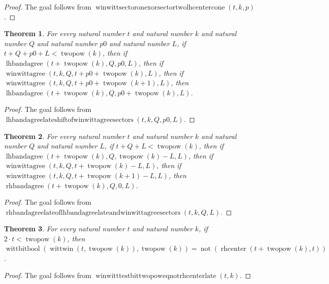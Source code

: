 \documentclass[11pt]{article}
\newtheorem{theorem}{Theorem}[section]
\theoremstyle{definition}
\begin{document}
\begin{proof}
The goal follows from \(\operatorname{winwittsectoronexorsectortwolhcentercone}(t, k, p)\).
\end{proof}
\begin{theorem}
\label{ll:paper:lhbandagree-late-shift-of-winwittagree-sectors}
For every natural number \(t\) and natural number \(k\) and natural number \(Q\) and natural number \(p0\) and natural number \(L\), if \(t + Q + p0 + L < \operatorname{twopow}(k)\), then if \(\operatorname{lhbandagree}(t + \operatorname{twopow}(k), Q, p0, L)\), then if \(\operatorname{winwittagree}(t, k, Q, t + p0 + \operatorname{twopow}(k), L)\), then if \(\operatorname{winwittagree}(t, k, Q, t + p0 + \operatorname{twopow}(k + 1), L)\), then \(\operatorname{lhbandagree}(t + \operatorname{twopow}(k), Q, p0 + \operatorname{twopow}(k), L)\).
\end{theorem}
\begin{proof}
The goal follows from \(\operatorname{lhbandagreelateshiftofwinwittagreesectors}(t, k, Q, p0, L)\).
\end{proof}
\begin{theorem}
\label{ll:paper:rhbandagree-late-of-lhbandagree-late-and-winwittagree-sectors}
For every natural number \(t\) and natural number \(k\) and natural number \(Q\) and natural number \(L\), if \(t + Q + L < \operatorname{twopow}(k)\), then if \(\operatorname{lhbandagree}(t + \operatorname{twopow}(k), Q, \operatorname{twopow}(k) - L, L)\), then if \(\operatorname{winwittagree}(t, k, Q, t + \operatorname{twopow}(k) - L, L)\), then if \(\operatorname{winwittagree}(t, k, Q, t + \operatorname{twopow}(k + 1) - L, L)\), then \(\operatorname{rhbandagree}(t + \operatorname{twopow}(k), Q, 0, L)\).
\end{theorem}
\begin{proof}
The goal follows from \(\operatorname{rhbandagreelateoflhbandagreelateandwinwittagreesectors}(t, k, Q, L)\).
\end{proof}
\begin{theorem}
\label{ll:paper:winwitt-testbit-twopow-eq-not-rhcenter-late}
For every natural number \(t\) and natural number \(k\), if \(2 \cdot t < \operatorname{twopow}(k)\), then \(\operatorname{wittbitbool}(\operatorname{wittwin}(t, \operatorname{twopow}(k)), \operatorname{twopow}(k)) = \operatorname{not}(\operatorname{rhcenter}(t + \operatorname{twopow}(k), t))\).
\end{theorem}
\begin{proof}
The goal follows from \(\operatorname{winwitttestbittwopoweqnotrhcenterlate}(t, k)\).
\end{proof}
\end{document}
